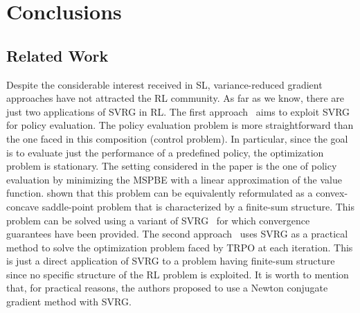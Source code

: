 \chapter{Conclusions} \label{chap:conclusions}
\section{Related Work}
\vspace{-0.05in}
Despite the considerable interest received in \acs{SL}, variance-reduced gradient approaches have not attracted the \acs{RL} community.
As far as we know, there are just two applications of \acs{SVRG} in \acs{RL}.
The first approach~\citep{du2017svrgpe} aims to exploit \acs{SVRG} for policy evaluation.
The policy evaluation problem is more straightforward than the one faced in this composition (control problem).
In particular, since the goal is to evaluate just the performance of a predefined policy, the optimization problem is stationary.
The setting considered in the paper is the one of policy evaluation by minimizing the \ac{MSPBE} with a linear approximation of the value function. \citet{du2017svrgpe} shown that this problem can be equivalently reformulated as a convex-concave saddle-point problem that is characterized by a finite-sum structure.
This problem can be solved using a variant of \acs{SVRG}~\citep{Palaniappan2016svrgsaddle} for which convergence guarantees have been provided.
The second approach~\citep{xu2017svrgtrpo} uses \acs{SVRG} as a practical method to solve the optimization problem faced by \acs{TRPO} at each iteration. This is just a direct application of \acs{SVRG} to a problem having finite-sum structure since no specific structure of the \acs{RL} problem is exploited.
It is worth to mention that, for practical reasons, the authors proposed to use a Newton conjugate gradient method with \acs{SVRG}.


